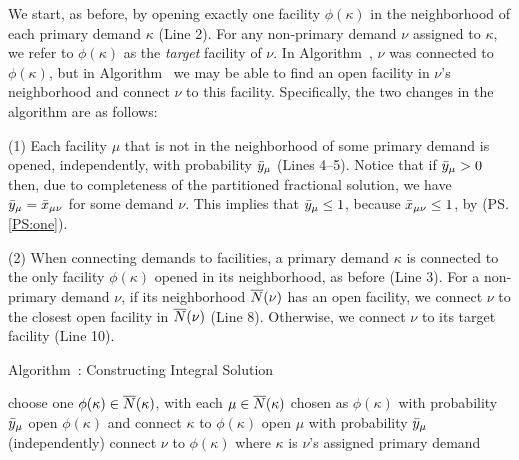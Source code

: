 We start, as before, by opening exactly one facility $\phi(\kappa)$ in the 
neighborhood of each primary demand $\kappa$ (Line 2).  For any
non-primary demand $\nu$ assigned to $\kappa$, we refer to
$\phi(\kappa)$ as the \emph{target} facility of $\nu$.  In
Algorithm~{\EGUP}, $\nu$ was connected to $\phi(\kappa)$,
but in Algorithm~{\ECHS} we may be able to find an open
facility in $\nu$'s neighborhood and connect $\nu$ to this
facility.  Specifically, the two changes in the
algorithm are as follows:
%
\begin{description}
	\item{(1)} Each facility $\mu$ that is not in the neighborhood of some primary
	demand is opened,
independently, with probability ${\bar y}_{\mu}$ (Lines
4--5). Notice that if ${\bar y}_\mu>0$ then,
due to completeness of the partitioned
fractional solution, we have ${\bar y}_{\mu}= {\bar x}_{\mu\nu}$
for some demand $\nu$. This implies that ${\bar y}_{\mu}\leq 1$,
because ${\bar x}_{\mu\nu}\le 1$, by (PS.\ref{PS:one}).
%
	\item{(2)} When connecting demands to facilities, a primary demand
$\kappa$ is connected to the only facility $\phi(\kappa)$
opened in its neighborhood, as before (Line 3).  For a
non-primary demand $\nu$, if its neighborhood ${\overline{N}}(\nu)$ has an open
facility, we connect $\nu$ to the closest open facility in ${\overline{N}}(\nu)$
(Line 8). Otherwise, we connect $\nu$ to
its target facility (Line 10).
%
\end{description}


\begin{algorithm}
  \caption{Algorithm~{\ECHS}:
    Constructing Integral Solution}
  \label{alg:lpr3}
  \begin{algorithmic}[1]
    \State choose one $\phi(\kappa)\in {\overline{N}}(\kappa)$,
    with each $\mu\in{\overline{N}}(\kappa)$ chosen as $\phi(\kappa)$
    with probability ${\bar y}_\mu$ 
    \State open $\phi(\kappa)$ and connect $\kappa$ to $\phi(\kappa)$
    \EndFor
    \State open $\mu$ with probability ${\bar y}_\mu$ (independently)
    \EndFor
    \Else
    \State connect $\nu$ to $\phi(\kappa)$ where $\kappa$ is $\nu$'s
     assigned primary demand
    \EndIf
    \EndFor
  \end{algorithmic}
\end{algorithm}


